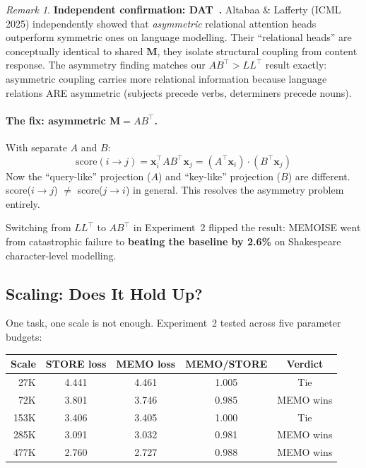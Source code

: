 \documentclass[11pt, a4paper]{article}
\newcommand{\M}{\mathbf{M}}
\newcommand{\x}{\mathbf{x}}
\theoremstyle{remark}
\newtheorem*{remark}{Remark}
\begin{document}
\begin{remark}
\textbf{Independent confirmation: DAT~\cite{altabaa2024dat}.}
Altabaa \& Lafferty (ICML 2025) independently showed that \emph{asymmetric} relational attention heads outperform symmetric ones on language modelling.
Their ``relational heads'' are conceptually identical to shared $\M$, they isolate structural coupling from content response.
The asymmetry finding matches our $AB^\top > LL^\top$ result exactly: asymmetric coupling carries more relational information because language relations ARE asymmetric (subjects precede verbs, determiners precede nouns).
\end{remark}

\paragraph{The fix: asymmetric $\M = AB^\top$.}
With separate $A$ and $B$:
\[
    \text{score}(i \to j) = \x_i^\top AB^\top \x_j = (A^\top \x_i) \cdot (B^\top \x_j)
\]
Now the ``query-like'' projection ($A$) and ``key-like'' projection ($B$) are different.
score($i \to j$) $\neq$ score($j \to i$) in general.
This resolves the asymmetry problem entirely.

Switching from $LL^\top$ to $AB^\top$ in Experiment~2 flipped the result: MEMOISE went from catastrophic failure to \textbf{beating the baseline by 2.6\%} on Shakespeare character-level modelling.

\subsection{Scaling: Does It Hold Up?}
\label{sec:grn:scaling}

One task, one scale is not enough.
Experiment~2 tested across five parameter budgets:

\begin{center}\small
\renewcommand{\arraystretch}{1.2}
\begin{tabular}{@{}rcccc@{}}
\toprule
\textbf{Scale} & \textbf{STORE loss} & \textbf{MEMO loss} & \textbf{MEMO/STORE} & \textbf{Verdict} \\
\midrule
27K & 4.441 & 4.461 & 1.005 & Tie \\
72K & 3.801 & 3.746 & 0.985 & MEMO wins \\
153K & 3.406 & 3.405 & 1.000 & Tie \\
285K & 3.091 & 3.032 & 0.981 & MEMO wins \\
477K & 2.760 & 2.727 & 0.988 & MEMO wins \\
\bottomrule
\end{tabular}
\end{center}
\end{document}
